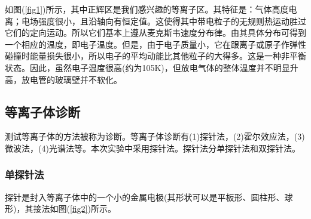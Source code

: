 \documentclass[a4paper]{article}
\begin{document}
如图(\ref{fig1})所示，其中正辉区是我们感兴趣的等离子区。其特征是：气体高度电离；电场强度很小，且沿轴向有恒定值。这使得其中带电粒子的无规则热运动胜过它们的定向运动。所以它们基本上遵从麦克斯韦速度分布律。由其具体分布可得到一个相应的温度，即电子温度。但是，由于电子质量小，它在跟离子或原子作弹性碰撞时能量损失很小，所以电子的平均动能比其他粒子的大得多。这是一种非平衡状态。因此，虽然电子温度很高(约为105K)，但放电气体的整体温度并不明显升高，放电管的玻璃壁并不软化。
\subsection{等离子体诊断}
测试等离子体的方法被称为诊断。等离子体诊断有(1)探针法，(2)霍尔效应法，(3)微波法，(4)光谱法等。本次实验中采用探针法。探针法分单探针法和双探针法。
\subsubsection{单探针法}
探针是封入等离子体中的一个小的金属电极(其形状可以是平板形、圆柱形、球形)，其接法如图(\ref{fig2})所示。
\end{document}
